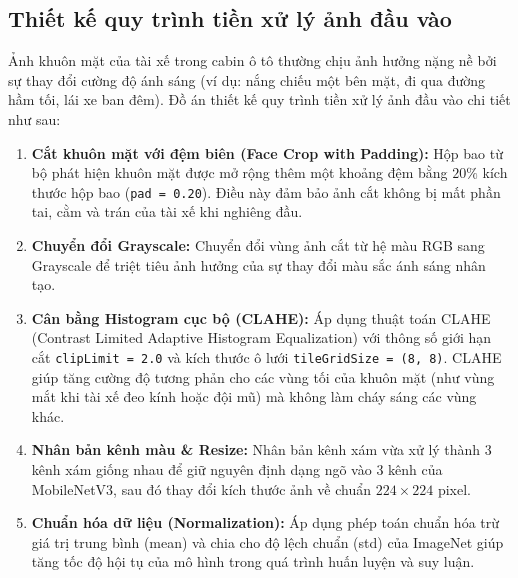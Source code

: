 \documentclass[../DoAn.tex]{subfiles}
\begin{document}
\subsection{Thiết kế quy trình tiền xử lý ảnh đầu vào}
Ảnh khuôn mặt của tài xế trong cabin ô tô thường chịu ảnh hưởng nặng nề bởi sự thay đổi cường độ ánh sáng (ví dụ: nắng chiếu một bên mặt, đi qua đường hầm tối, lái xe ban đêm). Đồ án thiết kế quy trình tiền xử lý ảnh đầu vào chi tiết như sau:
\begin{enumerate}
    \item \textbf{Cắt khuôn mặt với đệm biên (Face Crop with Padding):} Hộp bao từ bộ phát hiện khuôn mặt được mở rộng thêm một khoảng đệm bằng $20\%$ kích thước hộp bao (\texttt{pad = 0.20}). Điều này đảm bảo ảnh cắt không bị mất phần tai, cằm và trán của tài xế khi nghiêng đầu.
    \item \textbf{Chuyển đổi Grayscale:} Chuyển đổi vùng ảnh cắt từ hệ màu RGB sang Grayscale để triệt tiêu ảnh hưởng của sự thay đổi màu sắc ánh sáng nhân tạo.
    \item \textbf{Cân bằng Histogram cục bộ (CLAHE):} Áp dụng thuật toán CLAHE (Contrast Limited Adaptive Histogram Equalization) với thông số giới hạn cắt \texttt{clipLimit = 2.0} và kích thước ô lưới \texttt{tileGridSize = (8, 8)}. CLAHE giúp tăng cường độ tương phản cho các vùng tối của khuôn mặt (như vùng mắt khi tài xế đeo kính hoặc đội mũ) mà không làm cháy sáng các vùng khác.
    \item \textbf{Nhân bản kênh màu \& Resize:} Nhân bản kênh xám vừa xử lý thành 3 kênh xám giống nhau để giữ nguyên định dạng ngõ vào 3 kênh của MobileNetV3, sau đó thay đổi kích thước ảnh về chuẩn $224 \times 224$ pixel.
    \item \textbf{Chuẩn hóa dữ liệu (Normalization):} Áp dụng phép toán chuẩn hóa trừ giá trị trung bình (mean) và chia cho độ lệch chuẩn (std) của ImageNet giúp tăng tốc độ hội tụ của mô hình trong quá trình huấn luyện và suy luận.
\end{enumerate}
\end{document}
